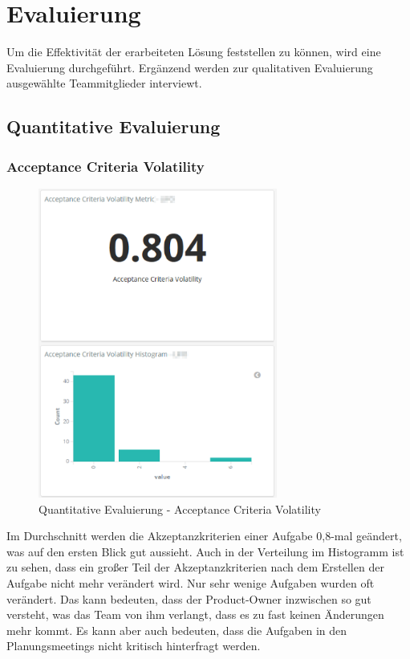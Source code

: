 \chapter{Evaluierung}

Um die Effektivität der erarbeiteten Lösung feststellen zu können, wird eine Evaluierung durchgeführt.
Ergänzend werden zur qualitativen Evaluierung ausgewählte Teammitglieder interviewt.

\clearpage
\section{Quantitative Evaluierung}
\subsection*{Acceptance Criteria Volatility}

\begin{savenotes}
    \begin{figure}[H]
      \centering
      \includegraphics[width=0.7\textwidth]{img/eval-ac-volatility.png}
      \caption{Quantitative Evaluierung {-} Acceptance Criteria Volatility}\label{fig:eval_ac_volatility}
    \end{figure}
\end{savenotes}

Im Durchschnitt werden die Akzeptanzkriterien einer Aufgabe 0,8-mal geändert, was auf den ersten Blick gut aussieht.
Auch in der Verteilung im Histogramm ist zu sehen, dass ein großer Teil der Akzeptanzkriterien nach dem Erstellen der Aufgabe nicht mehr verändert wird.
Nur sehr wenige Aufgaben wurden oft verändert.
Das kann bedeuten, dass der Product-Owner inzwischen so gut versteht, was das Team von ihm verlangt, dass es zu fast keinen Änderungen mehr kommt.
Es kann aber auch bedeuten, dass die Aufgaben in den Planungsmeetings nicht kritisch hinterfragt werden.

